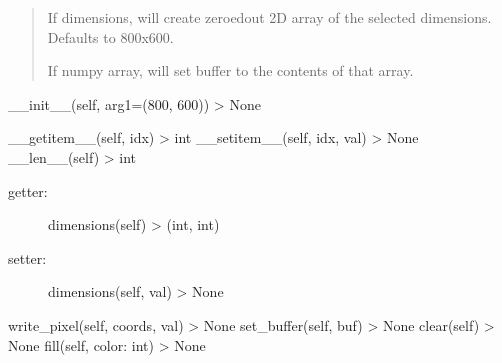 \documentclass[letterpaper,10pt,english]{sphinxmanual}
\begin{document}
\begin{fulllineitems}
\begin{quote}
\begin{description}
\sphinxAtStartPar
If dimensions, will create zeroed\sphinxhyphen{}out 2D array of the selected
dimensions. Defaults to 800x600.

\sphinxAtStartPar
If numpy array, will set buffer to the contents of that array.


\end{description}\end{quote}


\begin{fulllineitems}

\pysigstartsignatures
{}
\pysigstopsignatures
\sphinxAtStartPar
\_\_init\_\_(self, arg1=(800, 600)) \sphinxhyphen{}\textgreater{} None

\end{fulllineitems}



\begin{fulllineitems}

\pysigstartsignatures
{}
\pysigstopsignatures
\sphinxAtStartPar
\_\_getitem\_\_(self, idx) \sphinxhyphen{}\textgreater{} int
\_\_setitem\_\_(self, idx, val) \sphinxhyphen{}\textgreater{} None
\_\_len\_\_(self) \sphinxhyphen{}\textgreater{} int

\end{fulllineitems}



\begin{fulllineitems}

\pysigstartsignatures
{}
\pysigstopsignatures\begin{description}
\item[{getter:}] \leavevmode
\sphinxAtStartPar
dimensions(self) \sphinxhyphen{}\textgreater{} (int, int)

\item[{setter:}] \leavevmode
\sphinxAtStartPar
dimensions(self, val) \sphinxhyphen{}\textgreater{} None

\end{description}

\end{fulllineitems}



\begin{fulllineitems}

\pysigstartsignatures
{}
\pysigstopsignatures
\sphinxAtStartPar
write\_pixel(self, coords, val) \sphinxhyphen{}\textgreater{} None
set\_buffer(self, buf) \sphinxhyphen{}\textgreater{} None
clear(self) \sphinxhyphen{}\textgreater{} None
fill(self, color: int) \sphinxhyphen{}\textgreater{} None


\end{fulllineitems}
\end{fulllineitems}
\end{document}
